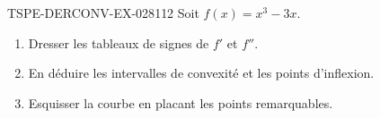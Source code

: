 \begin{exercice}{TSPE-DERCONV-EX-028}{1}{12}
Soit $f(x) = x^3 - 3x$.
\begin{enumerate}
  \item Dresser les tableaux de signes de $f'$ et $f''$.
  \item En déduire les intervalles de convexité et les points d'inflexion.
  \item Esquisser la courbe en placant les points remarquables.
\end{enumerate}

\end{exercice}
